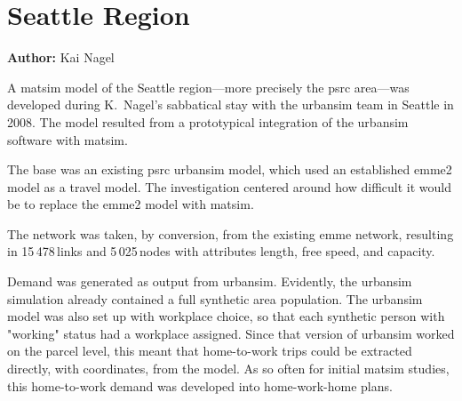 \section{Seattle Region}
\label{sec:seattle}
\hfill \textbf{Author:} Kai Nagel


A \gls{matsim} model of the Seattle region---more precisely the \gls{psrc} area---was developed during K.\ Nagel's sabbatical stay with the \gls{urbansim} team in Seattle in 2008. The model resulted from a prototypical integration of the \gls{urbansim} software \citep[e.g.,][]{WaddellEtc2003UrbanSim} with \gls{matsim}. 

The base was an existing \gls{psrc} \gls{urbansim} model, which used an established \gls{emme2} model 
as a travel model. The investigation centered around how difficult it would be to replace the \gls{emme2} model with \gls{matsim}. 

The network was taken, by conversion, from the existing \gls{emme} network, resulting in 15\,478\,links and 5\,025\,nodes with attributes length, free speed, and capacity.

Demand was generated as output from \gls{urbansim}. Evidently, the \gls{urbansim} simulation already contained a full synthetic area population. The \gls{urbansim} model was also set up with workplace choice, so that each synthetic person with "working" status had a workplace assigned. Since that version of \gls{urbansim} worked on the parcel level, this meant that home-to-work trips could be extracted directly, with coordinates, from the model. As so often for initial \gls{matsim}  studies, this home-to-work demand was developed into home-work-home plans.

